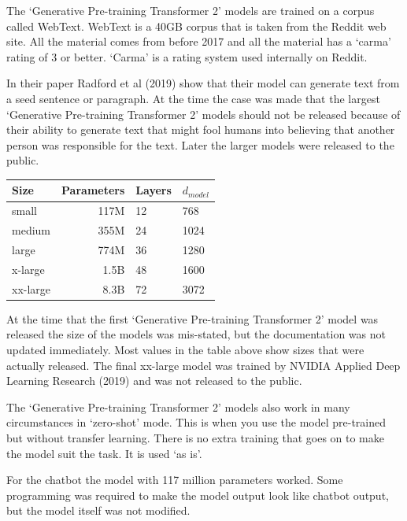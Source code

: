 The `Generative Pre-training Transformer 2' models are trained on a corpus called WebText. WebText is a 40GB corpus that is taken from the Reddit web site. All the material comes from before 2017 and all the material has a `carma' rating of 3 or better. `Carma' is a rating system used internally on Reddit. 

In their paper Radford et al (2019)\cite{radford2019language} show that their model can generate text from a seed sentence or paragraph. At the time the case was made that the largest `Generative Pre-training Transformer 2' models should not be released because of their ability to generate text that might fool humans into believing that another person was responsible for the text. Later the larger models were released to the public.

\begin{center}

\begin{tabular}{lrll}
	Size & Parameters & Layers & $d_{model}$ \\
	\hline
	small & 117M       & 12     & 768          \\
	medium & 355M       & 24     & 1024         \\
	large & 774M       & 36     & 1280         \\
	x-large & 1.5B     & 48     & 1600 \\
	xx-large & 8.3B   &  72 &   3072 
\end{tabular}

	
\end{center}

At the time that the first `Generative Pre-training Transformer 2' model was released the size of the models was mis-stated, but the documentation was not updated immediately. Most values in the table above show sizes that were actually released. The final xx-large model was trained by NVIDIA Applied Deep Learning Research (2019)\cite{2019NVIDIAadlr} and was not released to the public.

The `Generative Pre-training Transformer 2' models also work in many circumstances in `zero-shot' mode. This is when you use the model pre-trained but without transfer learning. There is no extra training that goes on to make the model suit the task. It is used `as is'.

For the chatbot the model with 117 million parameters worked. Some programming was required to make the model output look like chatbot output, but the model itself was not modified.

